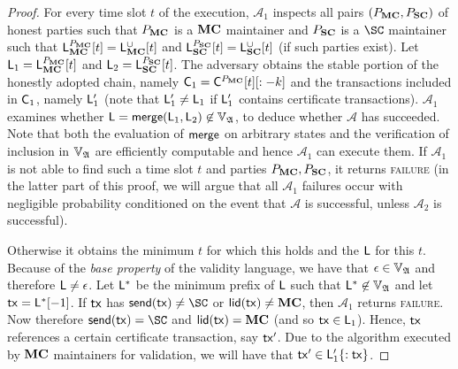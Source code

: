 \begin{proof}
  For every time slot $t$ of the execution, $\mathcal{A}_1$ inspects all pairs
  $(\party_\MC, \party_\Sidechain)$ of honest parties such that $\party_\MC$ is a $\MC$
  maintainer and $\party_\Sidechain$ is a $\SC$ maintainer such that
  $\LState_\MC^{\party_\MC}[t] = \LState_\MC^\cup[t]$ and
  $\LState_\Sidechain^{\party_\Sidechain}[t] = \LState_\Sidechain^\cup[t]$ (if such parties exist).
  Let $\LState_1 = \LState_\MC^{\party_\MC}[t]$ and
  $\LState_2 = \LState_\Sidechain^{\party_\Sidechain}[t]$.
  The adversary obtains the stable portion of the
  honestly adopted chain, namely $\Chain_1 = \LView{\Chain}{\party_\MC}{t}[:-k]$ and the
  transactions included in $\Chain_1$, namely $\LState'_1$ (note that
  $\LState'_1 \neq \LState_1$ if $\LState'_1$ contains certificate
  transactions). $\mathcal{A}_1$ examines whether $\LState = \merge(\LState_1,
  \LState_2) \not\in\adalang$, to deduce whether $\mathcal{A}$ has succeeded.
  Note that both the evaluation of $\merge$ on arbitrary states and the
  verification of inclusion in $\adalang$ are efficiently computable and hence
  $\mathcal{A}_1$ can execute them. If $\mathcal{A}_1$ is not able to find such
  a time slot $t$ and parties $\party_\MC, \party_\Sidechain$, it returns \textsc{failure}
  (in the latter part of this proof, we will argue that all $\mathcal{A}_1$
  failures occur with negligible probability conditioned on the event that
  $\mathcal{A}$ is successful, unless $\mathcal{A}_2$ is successful).

  Otherwise it obtains the minimum $t$ for which this holds and the $\LState$
  for this $t$. Because of the \emph{base property} of the validity language, we
  have that $\epsilon \in \adalang$ and therefore $\LState \neq \epsilon$. Let
  $\LState^*$ be the minimum prefix of $\LState$ such that $\LState^* \not\in
  \adalang$ and let $\tx = \LState^*[-1]$. If $\tx$ has $\send(\tx) \neq \SC$ or
  $\llid(\tx) \neq \MC$, then $\mathcal{A}_1$ returns \textsc{failure}. Now
  therefore $\send(\tx) = \SC$ and $\llid(\tx) = \MC$ (and so $\tx \in \LState_1$).
  Hence, $\tx$ references a certain certificate transaction, say $\tx'$. Due to
  the algorithm executed by $\MC$ maintainers for validation, we will have that
  $\tx' \in \LState'_1\{:\tx\}$.


\end{proof}
